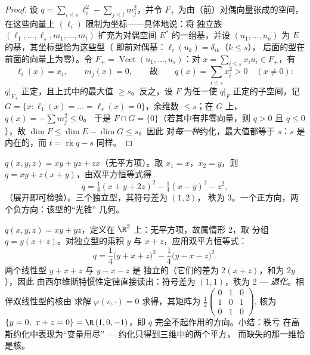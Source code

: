\begin{proof}
设 $q = \sum_{i \leq s}\ell_i^2 - \sum_{j\leq t} m_j^2$，并令
$F_+$ 为由（前）对偶向量张成的空间，在这些向量上 $(\ell_i)$
限制为坐标——具体地说：将
独立族 $(\ell_1, \dots, \ell_s, m_1, \dots, m_t)$
扩充为对偶空间 $E^*$ 的一组基，并设 $(u_1, \dots, u_n)$ 为
$E$ 的基，其坐标型恰为这些型（
即前对偶基：$\ell_i(u_k) = \delta_{ik}$（$k \leq s$），
后面的型在前面的向量上为零）。令 $F_+ =
\operatorname{Vect}(u_1, \dots, u_s)$：对 $x = \sum_{i\leq
s}x_iu_i \in F_+$，有
\[
\ell_i(x) = x_i,
\qquad m_j(x) = 0,
\qquad\text{故}\qquad
q(x) = \sum_{i\leq s}x_i^2 > 0 \quad (x \neq 0) :
\]
$q|_{F_+}$ 正定，且上式中的最大值
$\geq s$。反之，设 $F$ 为任一使 $q|_F$
正定的子空间，记 $G = \{x : \ell_1(x) = \dots = \ell_s(x) =
0\}$，余维数 $\leq s$；在 $G$ 上，$q(x) = -\sum m_j^2 \leq 0$。
于是 $F \cap G = \{0\}$（若其中有非零向量，则 $q > 0$
且 $q \leq 0$），故 $\dim F \leq \dim E - \dim G \leq s$。因此
对\emph{每一种}约化，最大值都等于 $s$：$s$ 是内在的，而 $t
= \operatorname{rk} q - s$ 同样。
\end{proof}

\begin{example}\label{ex:b2:quadratic:gaussexample}
$q(x, y, z) = xy + yz + zx$（无平方项）。取 $x_1 = x$，$x_2 =
y$，则 $q = xy + z(x + y)$，由双平方恒等式得
\[
q = \tfrac14(x + y + 2z)^2 - \tfrac14(x - y)^2 - z^2 ,
\]
（展开即可检验）。三个独立型，其符号差为 $(1, 2)$，
秩为 $3$。一个正方向，两个负方向：该型的“光锥”
几何。
\end{example}

\begin{example}\label{ex:b2:quadratic:degenerate}
$q(x, y, z) = xy + yz$，定义在 $\R^3$ 上：无平方项，故属情形 2，取
分组 $q = y(x + z)$。对独立型的乘积
$y$ 与 $x + z$，应用双平方恒等式：
\[
q = \frac14\bigl(y + x + z\bigr)^2 -
\frac14\bigl(y - x - z\bigr)^2 .
\]
两个线性型 $y + x + z$ 与 $y - x - z$ 是
独立的（它们的差为 $2(x+z)$，和为 $2y$），因此
由西尔维斯特惯性定律直接读出：符号差为 $(1, 1)$，秩为 $2$ ---
\emph{退化}。相伴双线性型的核由
求解 $\varphi(v, \cdot) = 0$ 求得，其矩阵为
$\frac12\begin{pmatrix} 0&1&0\\ 1&0&1\\ 0&1&0\end{pmatrix}$,
核为 $\{y = 0,\ x + z = 0\} = \R\,(1, 0, -1)$，即
$q$ 完全不起作用的方向。小结：秩亏
在高斯约化中表现为“变量用尽”
--- 约化只得到三维中的两个平方，
而缺失的那一维恰是核。
\end{example}

